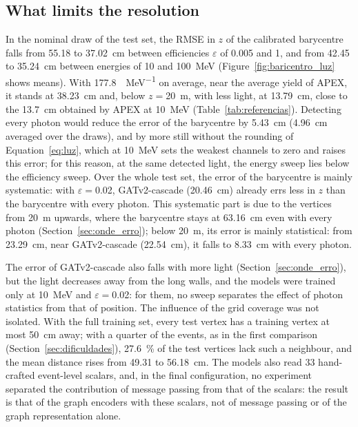 \subsection{What limits the resolution}
\label{sec:limites}

In the nominal draw of the test set, the RMSE in $z$ of the calibrated barycentre falls from \num{55.18} to \qty{37.02}{\cm} between efficiencies $\varepsilon$ of \num{0.005} and \num{1}, and from \num{42.45} to \qty{35.24}{\cm} between energies of \num{10} and \qty{100}{\MeV} (Figure~\ref{fig:baricentro_luz} shows means). With \qty{177.8}{\pe\per\MeV} on average, near the average yield of APEX, it stands at \qty{38.23}{\cm} and, below $z = {}$\qty{20}{\m}, with less light, at \qty{13.79}{\cm}, close to the \qty{13.7}{\cm} obtained by APEX at \qty{10}{\MeV} (Table~\ref{tab:referencias}). Detecting every photon would reduce the error of the barycentre by \qty{5.43}{\cm} (\qty{4.96}{\cm} averaged over the draws), and by more still without the rounding of Equation~\eqref{eq:luz}, which at \qty{10}{\MeV} sets the weakest channels to zero and raises this error; for this reason, at the same detected light, the energy sweep lies below the efficiency sweep. Over the whole test set, the error of the barycentre is mainly systematic: with $\varepsilon = {}$\num{0.02}, GATv2-cascade (\qty{20.46}{\cm}) already errs less in $z$ than the barycentre with every photon. This systematic part is due to the vertices from \qty{20}{\m} upwards, where the barycentre stays at \qty{63.16}{\cm} even with every photon (Section~\ref{sec:onde_erro}); below \qty{20}{\m}, its error is mainly statistical: from \qty{23.29}{\cm}, near GATv2-cascade (\qty{22.54}{\cm}), it falls to \qty{8.33}{\cm} with every photon.

The error of GATv2-cascade also falls with more light (Section~\ref{sec:onde_erro}), but the light decreases away from the long walls, and the models were trained only at \qty{10}{\MeV} and $\varepsilon = {}$\num{0.02}: for them, no sweep separates the effect of photon statistics from that of position. The influence of the grid coverage was not isolated. With the full training set, every test vertex has a training vertex at most \qty{50}{\cm} away; with a quarter of the events, as in the first comparison (Section~\ref{sec:dificuldades}), \qty{27.6}{\percent} of the test vertices lack such a neighbour, and the mean distance rises from \num{49.31} to \qty{56.18}{\cm}. The models also read \num{33} hand-crafted event-level scalars, and, in the final configuration, no experiment separated the contribution of message passing from that of the scalars: the result is that of the graph encoders with these scalars, not of message passing or of the graph representation alone.
